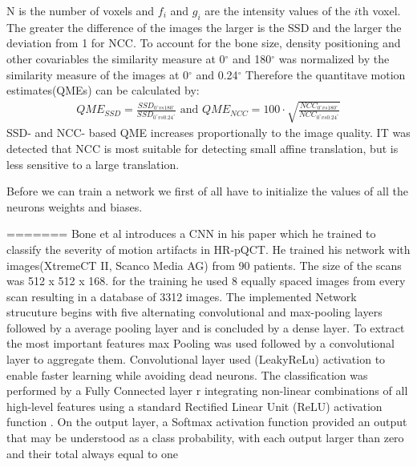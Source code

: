 \documentclass[
a4paper, 
12pt,
grayscalebody, %
abstract=on,
twoside, BCOR10mm, 12pt, DIV13,headinclude, footexclude, final, abstracton, openright
]{ibireprt}
\numberwithin{equation}{chapter}
\numberwithin{table}{chapter}
\numberwithin{figure}{chapter}
\numberwithin{algorithm}{chapter}
\numberwithin{example}{chapter}
\numberwithin{example}{chapter}
\begin{document}
N is the number of voxels and $f_i$ and $g_i$ are the intensity values of the $i$th voxel. The greater the difference of the images the larger is the SSD and the larger the deviation from 1 for NCC. To account for the bone size, density positioning and other covariables the similarity measure at 0$^{\circ}$ and 180$^{\circ}$ was normalized by the similarity measure of the images at 0$^{\circ}$ and 0.24$^{\circ}$
Therefore the quantitave motion estimates(QMEs) can be calculated by: 
\begin{align}
	QME_{SSD}= \frac{SSD_{0^{\circ} vs 180^{\circ}}}{SSD_{0^{\circ} vs 0.24^{\circ}}} \textrm{ and }	QME_{NCC}=100 \cdot \sqrt{ \frac{NCC_{0^{\circ} vs 180^{\circ}}}{NCC_{0^{\circ} vs 0.24^{\circ}}}}
\end{align}
SSD- and NCC- based QME increases proportionally to the image quality. IT was detected that NCC is most suitable for detecting small affine translation, but is less sensitive to a large translation.


Before we can train a network we first of all have to initialize the values of all the neurons weights and biases.  


=======
Bone et al introduces a CNN in his paper which he trained to classify the severity of motion artifacts in HR-pQCT. He trained his network with images(XtremeCT II, Scanco Media AG) from 90 patients. The size of the scans was 512 x 512 x 168. for the training he used 8 equally spaced images from every scan  resulting in a database of 3312 images.
The implemented Network strucuture begins with five alternating convolutional and max-pooling layers followed by a average pooling layer and is concluded by a dense layer. To extract the most important features max Pooling was used followed by a convolutional layer to aggregate them. Convolutional layer used (LeakyReLu) activation to enable faster learning while avoiding dead neurons.
 The classification was performed by a Fully Connected layer r integrating non-linear combinations of all high-level features using a standard Rectified Linear
Unit (ReLU) activation function . On the output layer, a Softmax activation function provided an output that may be understood as a class probability, with each output larger than zero and their total always equal to one
\end{document}
